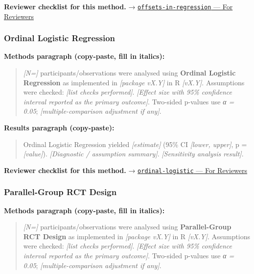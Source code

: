 \documentclass[
]{article}
\begin{document}
\textbf{Reviewer checklist for this method.} →
\href{../chapters/07-regression/offsets-in-regression.Rmd\#for-reviewers}{\texttt{offsets-in-regression}
--- For Reviewers}

\subsubsection{Ordinal Logistic
Regression}\label{ordinal-logistic-regression}

\textbf{Methods paragraph (copy-paste, fill in italics):}

\begin{quote}
\emph{{[}N={]}} participants/observations were analysed using
\textbf{Ordinal Logistic Regression} as implemented in \emph{{[}package
vX.Y{]}} in R \emph{{[}vX.Y{]}}. Assumptions were checked: \emph{{[}list
checks performed{]}}. \emph{{[}Effect size with 95\% confidence interval
reported as the primary outcome{]}}. Two-sided p-values use \emph{α =
0.05}; \emph{{[}multiple-comparison adjustment if any{]}}.
\end{quote}

\textbf{Results paragraph (copy-paste):}

\begin{quote}
Ordinal Logistic Regression yielded \emph{{[}estimate{]}} (95\% CI
\emph{{[}lower, upper{]}}, p = \emph{{[}value{]}}). \emph{{[}Diagnostic
/ assumption summary{]}}. \emph{{[}Sensitivity analysis result{]}}.
\end{quote}

\textbf{Reviewer checklist for this method.} →
\href{../chapters/07-regression/ordinal-logistic.Rmd\#for-reviewers}{\texttt{ordinal-logistic}
--- For Reviewers}

\subsubsection{Parallel-Group RCT
Design}\label{parallel-group-rct-design}

\textbf{Methods paragraph (copy-paste, fill in italics):}

\begin{quote}
\emph{{[}N={]}} participants/observations were analysed using
\textbf{Parallel-Group RCT Design} as implemented in \emph{{[}package
vX.Y{]}} in R \emph{{[}vX.Y{]}}. Assumptions were checked: \emph{{[}list
checks performed{]}}. \emph{{[}Effect size with 95\% confidence interval
reported as the primary outcome{]}}. Two-sided p-values use \emph{α =
0.05}; \emph{{[}multiple-comparison adjustment if any{]}}.
\end{quote}
\end{document}

